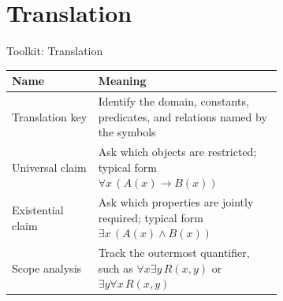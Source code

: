 \section{Translation}

\begin{toolkitbox}{Toolkit: Translation}
\small
\begin{tabular}{l p{0.68\linewidth}}
\toprule
\textbf{Name} & \textbf{Meaning} \\
\midrule
Translation key & Identify the domain, constants, predicates, and relations named by the symbols \\
Universal claim & Ask which objects are restricted; typical form \(\forall x\,(A(x)\to B(x))\) \\
Existential claim & Ask which properties are jointly required; typical form \(\exists x\,(A(x)\land B(x))\) \\
Scope analysis & Track the outermost quantifier, such as \(\forall x\exists y\,R(x,y)\) or \(\exists y\forall x\,R(x,y)\) \\
\bottomrule
\end{tabular}
\end{toolkitbox}





